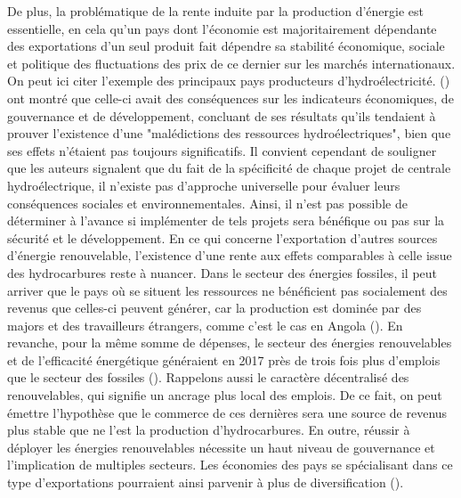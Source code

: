 De plus, la problématique de la rente induite par la production d'énergie est essentielle, en cela qu'un pays dont l'économie est majoritairement dépendante des exportations d'un seul produit fait dépendre sa stabilité économique, sociale et politique des fluctuations des prix de ce dernier sur les marchés internationaux. On peut ici citer l'exemple des principaux pays producteurs d'hydroélectricité. (\cite{sovacool_major_2018}) ont montré que celle-ci avait des conséquences sur les indicateurs économiques, de gouvernance et de développement, concluant de ses résultats qu'ils tendaient à prouver l'existence d'une "malédictions des ressources hydroélectriques", bien que ses effets n'étaient pas toujours significatifs. Il convient cependant de souligner que les auteurs signalent que du fait de la spécificité de chaque projet de centrale hydroélectrique, il n'existe pas d'approche universelle pour évaluer leurs conséquences sociales et environnementales. Ainsi, il n'est pas possible de déterminer à l'avance si implémenter de tels projets sera bénéfique ou pas sur la sécurité et le développement. 
\smallbreak
En ce qui concerne l'exportation d'autres sources d'énergie renouvelable, l'existence d'une rente aux effets comparables à celle issue des hydrocarbures reste à nuancer. Dans le secteur des énergies fossiles, il peut arriver que le pays où se situent les ressources ne bénéficient pas socialement des revenus que celles-ci peuvent générer, car la production est dominée par des majors et des travailleurs étrangers, comme c'est le cas en Angola (\cite{ovadia_angola_2018}). En revanche, pour la même somme de dépenses, le secteur des énergies renouvelables et de l'efficacité énergétique généraient en 2017 près de trois fois plus d'emplois que le secteur des fossiles (\cite{garrett-peltier_green_2017}). Rappelons aussi le caractère décentralisé des renouvelables, qui signifie un ancrage plus local des emplois. De ce fait, on peut émettre l'hypothèse que le commerce de ces dernières sera une source de revenus plus stable que ne l'est la production d'hydrocarbures. En outre, réussir à déployer les énergies renouvelables nécessite un haut niveau de gouvernance et l'implication de multiples secteurs. Les économies des pays se spécialisant dans ce type d'exportations pourraient ainsi parvenir à plus de diversification (\cite{osullivan_geopolitics_2017}).
\smallbreak
